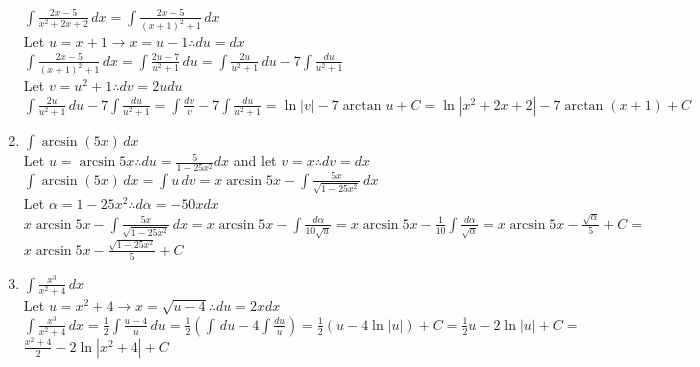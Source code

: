 \documentclass[10pt, letterpaper]{report}
\begin{document}
\begin{enumerate}
    $\int{\frac{2x-5}{x^{2}+2x+2}}\,dx=\int{\frac{2x-5}{(x+1)^{2}+1}}\,dx$ \\

    Let $u=x+1\rightarrow x=u-1\therefore du=dx$ \\

    $\int{\frac{2x-5}{(x+1)^{2}+1}}\,dx=\int{\frac{2u-7}{u^{2}+1}}\,du=
    \int{\frac{2u}{u^{2}+1}}\,du-7\int{\frac{du}{u^{2}+1}}$ \\

    Let $v=u^{2}+1\therefore dv=2udu$ \\

    $\int{\frac{2u}{u^{2}+1}}\,du-7\int{\frac{du}{u^{2}+1}}=
    \int{\frac{dv}{v}}-7\int{\frac{du}{u^{2}+1}}=
    \ln{|v|}-7\arctan{u}+C=\ln{|x^{2}+2x+2|}-7\arctan{(x+1)}+C$ \\

  \item{$\int{\arcsin{(5x)}}\,dx$} \\

    Let $u=\arcsin{5x}\therefore du=\frac{5}{1-25x^{2}}dx$ and let $v=x\therefore dv=dx$ \\

    $\int{\arcsin{(5x)}}\,dx=\int{u}\,dv=x\arcsin{5x}-\int{\frac{5x}{\sqrt{1-25x^{2}}}}\,dx$ \\

    Let $\alpha=1-25x^{2}\therefore d\alpha=-50xdx$ \\

    $x\arcsin{5x}-\int{\frac{5x}{\sqrt{1-25x^{2}}}}\,dx=
    x\arcsin{5x}-\int{\frac{d\alpha}{10\sqrt{u}}}=
    x\arcsin{5x}-\frac{1}{10}\int{\frac{d\alpha}{\sqrt{\alpha}}}=
    x\arcsin{5x}-\frac{\sqrt{\alpha}}{5}+C=$ \\

    $x\arcsin{5x}-\frac{\sqrt{1-25x^{2}}}{5}+C$ \\

  \item{$\int{\frac{x^{3}}{x^{2}+4}}\,dx$} \\

    Let $u=x^{2}+4\rightarrow x=\sqrt{u-4}\therefore du=2xdx$ \\

    $\int{\frac{x^{3}}{x^{2}+4}}\,dx=\frac{1}{2}\int{\frac{u-4}{u}}\,du=
    \frac{1}{2}\left(\int{}\,du-4\int{\frac{du}{u}}\right)=
    \frac{1}{2}\left(u-4\ln{|u|}\right)+C=
    \frac{1}{2}u-2\ln{|u|}+C=$ \\

    $\frac{x^{2}+4}{2}-2\ln{|x^{2}+4|}+C$ \\


\end{enumerate}
\end{document}
